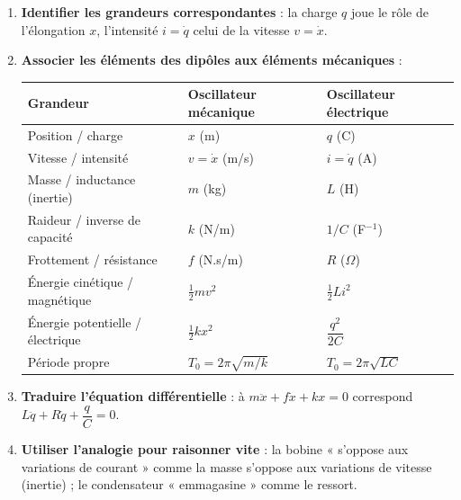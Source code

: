 \documentclass[11pt]{article}
\begin{document}
\begin{methode}
\begin{enumerate}
\item \textbf{Identifier les grandeurs correspondantes} : la charge $q$ joue le rôle de l'élongation $x$, l'intensité $i = \dot{q}$ celui de la vitesse $v = \dot{x}$.
\item \textbf{Associer les éléments des dipôles aux éléments mécaniques} :
\begin{center}
\begin{tabularx}{\linewidth}{|l|X|X|}
\hline
\rowcolor{popblueL} \textbf{Grandeur} & \textbf{Oscillateur mécanique} & \textbf{Oscillateur électrique} \\
\hline
Position / charge & $x$ (m) & $q$ (C) \\
\hline
Vitesse / intensité & $v = \dot{x}$ (m/s) & $i = \dot{q}$ (A) \\
\hline
Masse / inductance (inertie) & $m$ (kg) & $L$ (H) \\
\hline
Raideur / inverse de capacité & $k$ (N/m) & $1/C$ (F$^{-1}$) \\
\hline
Frottement / résistance & $f$ (N.s/m) & $R$ ($\Omega$) \\
\hline
Énergie cinétique / magnétique & $\frac{1}{2}mv^2$ & $\frac{1}{2}Li^2$ \\
\hline
Énergie potentielle / électrique & $\frac{1}{2}kx^2$ & $\dfrac{q^2}{2C}$ \\
\hline
Période propre & $T_0 = 2\pi\sqrt{m/k}$ & $T_0 = 2\pi\sqrt{LC}$ \\
\hline
\end{tabularx}
\end{center}
\item \textbf{Traduire l'équation différentielle} : à $m\ddot{x} + f\dot{x} + kx = 0$ correspond $L\ddot{q} + R\dot{q} + \dfrac{q}{C} = 0$.
\item \textbf{Utiliser l'analogie pour raisonner vite} : la bobine « s'oppose aux variations de courant » comme la masse s'oppose aux variations de vitesse (inertie) ; le condensateur « emmagasine » comme le ressort.
\end{enumerate}
\end{methode}
\end{document}
